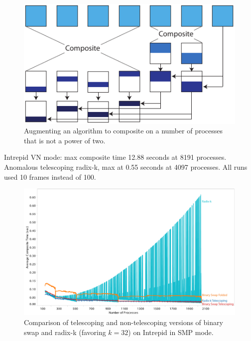 \documentclass{vgtc}                          %
\begin{document}
\begin{figure}[htbp]
  \centering
  \includegraphics{images/TelescopeDiagram}
  \caption{Augmenting an algorithm to composite on a number of processes
    that is not a power of two.}
  \label{fig:TelescopeDiagram}
\end{figure}

Intrepid VN mode: max composite time 12.88 seconds at 8191 processes.
Anomalous telescoping radix-k, max at 0.55 seconds at 4097 processes.
All runs used 10 frames instead of 100.

\begin{figure}[htbp]
  \centering
  \includegraphics[width=\linewidth]{images/TelescopeCompositeIntrepidSMP}
  \caption{Comparison of telescoping and non-telescoping versions of binary
    swap and radix-k (favoring $k=32$) on Intrepid in SMP mode.}
  \label{fig:TelescopeCompositeIntrepidSMP}
\end{figure}
\end{document}
